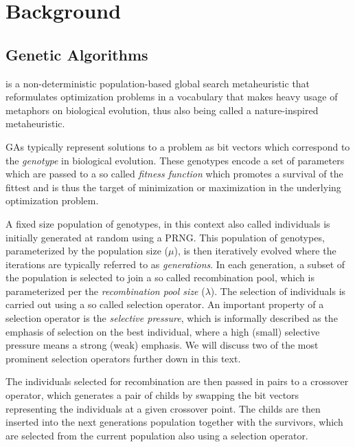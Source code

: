 \chapter{Background}
\label{ch:sota}

\section{Genetic Algorithms}
\label{sec:ga}
 is a non-deterministic population-based global search metaheuristic that reformulates optimization problems in a vocabulary that makes heavy usage of metaphors on biological evolution, thus also being called a nature-inspired metaheuristic.

\aclp{GA} typically represent solutions to a problem as bit vectors which correspond to the \emph{genotype} in biological evolution.
These genotypes encode a set of parameters which are passed to a so called \emph{fitness function} which promotes a survival of the fittest and is thus the target of minimization or maximization in the underlying optimization problem.

A fixed size population of genotypes, in this context also called individuals is initially generated at random using a \ac{PRNG}.
This population of genotypes, parameterized by the population size ($\mu$), is then iteratively evolved where the iterations are typically referred to as \emph{generations}.
In each generation, a subset of the population is selected to join a so called recombination pool, which is parameterized per the \emph{recombination pool size} ($\lambda$).
The selection of individuals is carried out using a so called selection operator.
An important property of a selection operator is the \emph{selective pressure}, which is informally described as the emphasis of selection on the best individual, where a high (small) selective pressure means a strong (weak) emphasis.
We will discuss two of the most prominent selection operators further down in this text.

The individuals selected for recombination are then passed in pairs to a crossover operator, which generates a pair of childs by swapping the bit vectors representing the individuals at a given crossover point.
The childs are then inserted into the next generations population together with the survivors, which are selected from the current population also using a selection operator.

